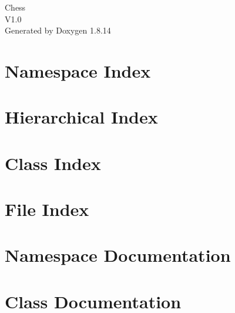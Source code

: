 \documentclass[twoside]{book}
\newcommand{\+}{\discretionary{\mbox{\scriptsize$\hookleftarrow$}}{}{}}
\newcommand{\clearemptydoublepage}{%
  \newpage{\pagestyle{empty}\cleardoublepage}%
}
\begin{document}
\hypersetup{pageanchor=false,
             bookmarksnumbered=true,
             pdfencoding=unicode
            }
\begin{titlepage}
\vspace*{7cm}
\begin{center}%
{\Large Chess \\[1ex]\large V1.\+0 }\\
\vspace*{1cm}
{\large Generated by Doxygen 1.8.14}\\
\end{center}
\end{titlepage}
\clearemptydoublepage
{}
\tableofcontents
\clearemptydoublepage
{}
\hypersetup{pageanchor=true}

\chapter{Namespace Index}

\chapter{Hierarchical Index}

\chapter{Class Index}

\chapter{File Index}

\chapter{Namespace Documentation}






\chapter{Class Documentation}
























\end{document}
